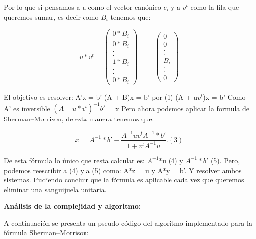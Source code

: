 \documentclass[a4paper]{article}
\begin{document}
Por lo que si pensamos a u como el vector canónico $e_i$ y a $v^t$ como la fila que queremos sumar, es decir como $B_i$ tenemos que:


$$
u*v^t=
\begin{pmatrix} 
0*B_i\\
0*B_i\\
.\\
.\\
1*B_i\\
.\\
.\\
0*B_i
\end{pmatrix}
\quad 
=
\begin{pmatrix} 
0\\
0\\
.\\
.\\
B_i\\
.\\
.\\
0
\end{pmatrix}
$$

El objetivo es resolver:\newline
A'x = b'\newline 
(A + B)x = b' por (1) \newline
(A + u$v^t$)x  = b'\newline
Como A' es inversible
$(A + u*v^t)^{-1}b'$ = x\newline
Pero ahora podemos aplicar la formula de Sherman–Morrison, de esta manera tenemos que: 

\begin{equation}
x =\ A^{-1}*b' - \frac{ A^{-1} u v^t A^{-1}*b'}{1+v^t A^{-1}u}.\label{eq:sm}(3)
\end{equation} 

De esta fórmula lo único que resta calcular es: $A^{-1}$*u (4) y $A^{-1}*b'$ (5).\newline
Pero, podemos reescribir a (4) y a (5) como:\newline
 A*z = u y A*y = b'. Y resolver ambos sistemas. Pudiendo concluir que la fórmula es aplicable cada vez que queremos eliminar una sanguijuela unitaria. \newline
 
 
\textbf{Análisis de la complejidad y algoritmo:} \newline

A continuación se presenta un pseudo-código del algoritmo implementado para la fórmula Sherman–Morrison:
\end{document}
